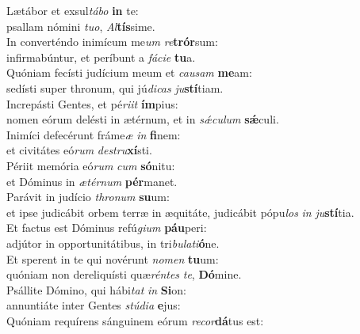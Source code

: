 \evenverse Lætábor et exsul\textit{tá}\textit{bo} \textbf{in} te:~\*\\
\evenverse psallam nómini \textit{tu}\textit{o}, \textit{Al}\textbf{tís}sime.\\
\oddverse In converténdo inimícum me\textit{um} \textit{re}\textbf{trór}sum:~\*\\
\oddverse infirmabúntur, et períbunt a \textit{fá}\textit{ci}\textit{e} \textbf{tu}a.\\
\evenverse Quóniam fecísti judícium meum et \textit{cau}\textit{sam} \textbf{me}am:~\*\\
\evenverse sedísti super thronum, qui jú\textit{di}\textit{cas} \textit{ju}\textbf{stí}tiam.\\
\oddverse Increpásti Gentes, et pé\textit{ri}\textit{it} \textbf{ím}pius:~\*\\
\oddverse nomen eórum delésti in ætérnum, et in \textit{sǽ}\textit{cu}\textit{lum} \textbf{sǽ}culi.\\
\evenverse Inimíci defecérunt fráme\textit{æ} \textit{in} \textbf{fi}nem:~\*\\
\evenverse et civitátes eó\textit{rum} \textit{de}\textit{stru}\textbf{xí}sti.\\
\oddverse Périit memória eó\textit{rum} \textit{cum} \textbf{só}nitu:~\*\\
\oddverse et Dóminus in \textit{æ}\textit{tér}\textit{num} \textbf{pér}manet.\\
\evenverse Parávit in judício \textit{thro}\textit{num} \textbf{su}um:~\*\\
\evenverse et ipse judicábit orbem terræ in æquitáte, judicábit pópu\textit{los} \textit{in} \textit{ju}\textbf{stí}tia.\\
\oddverse Et factus est Dóminus refú\textit{gi}\textit{um} \textbf{páu}peri:~\*\\
\oddverse adjútor in opportunitátibus, in tri\textit{bu}\textit{la}\textit{ti}\textbf{ó}ne.\\
\evenverse Et sperent in te qui novérunt \textit{no}\textit{men} \textbf{tu}um:~\*\\
\evenverse quóniam non dereliquísti quæ\textit{rén}\textit{tes} \textit{te}, \textbf{Dó}mine.\\
\oddverse Psállite Dómino, qui hábi\textit{tat} \textit{in} \textbf{Si}on:~\*\\
\oddverse annuntiáte inter Gentes \textit{stú}\textit{di}\textit{a} \textbf{e}jus:\\
\evenverse Quóniam requírens sánguinem eórum \textit{re}\textit{cor}\textbf{dá}tus est:~\*\\

